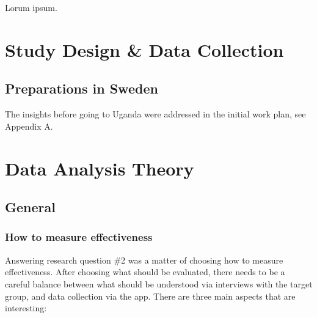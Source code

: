 Lorum ipsum.

\section{Study Design \& Data Collection}







\subsection{Preparations in Sweden}

The insights before going to Uganda were addressed in the initial work plan, see Appendix A. 











\section{Data Analysis Theory}

\subsection{General}


\subsubsection{How to measure effectiveness}

Answering research question \#2 was a matter of choosing how to measure effectiveness. After choosing what should be evaluated, there needs to be a careful balance between what should be understood via interviews with the target group, and data collection via the app. There are three main aspects that are interesting:

